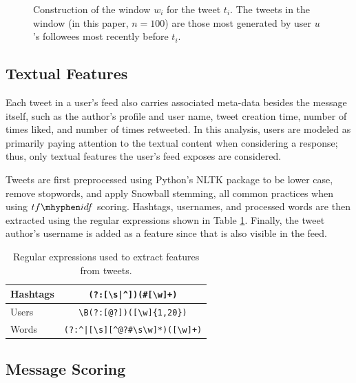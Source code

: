 \begin{figure}[!htbp]
\centering
\fontsize{8pt}{10pt}\selectfont

\caption{Construction of the window $w_i$ for the tweet $t_i$. The tweets in the window (in this paper, $n=100$) are those most generated by user $u$'s followees most recently before $t_i$.} \label{fig:fig_window_explanation}
\end{figure}

\subsection{Textual Features}

Each tweet in a user's feed also carries associated meta-data besides the message itself, such as the author's profile and user name, tweet creation time, number of times liked, and number of times retweeted. In this analysis, users are modeled as primarily paying attention to the textual content when considering a response; thus, only textual features the user's feed exposes are considered.  

Tweets are first preprocessed using Python's NLTK package \cite{Bird2009} to be lower case, remove stopwords, and apply Snowball stemming, all common practices when using $tf\mhyphen idf$ scoring.  Hashtags, usernames, and processed words are then extracted using the regular expressions shown in Table \ref{tab:regularExpressions}.  Finally, the tweet author's username is added as a feature since that is also visible in the feed.

\begin{table}[!tb]
	\fontsize{9pt}{10pt}\selectfont
	\centering
		\caption{Regular expressions used to extract features from tweets.}
		\begin{tabular}{|l|c|}
			\hline
			Hashtags & \verb!(?:[\s|^])(#[\w]+)! \\ \hline
			Users & \verb!\B(?:[@?])([\w]{1,20})! \\ \hline
			Words & \verb!(?:^|[\s][^@?#\s\w]*)([\w]+)! \\ \hline
		\end{tabular}
	\label{tab:regularExpressions}
\end{table}

\subsection{Message Scoring}

